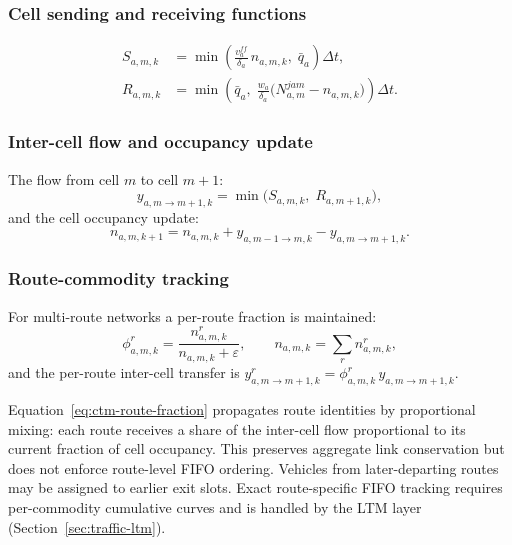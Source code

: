 \subsubsection{Cell sending and receiving functions}

\begin{align}
  S_{a,m,k} &= \min\!\left(\frac{v^{ff}_a}{\delta_a}\,n_{a,m,k},\;
                            \bar{q}_a\right)\!\Delta t,
  \label{eq:ctm-send}\\
  R_{a,m,k} &= \min\!\left(\bar{q}_a,\;
                            \frac{w_a}{\delta_a}
                            \bigl(N^{jam}_{a,m} - n_{a,m,k}\bigr)\right)\!\Delta t.
  \label{eq:ctm-recv}
\end{align}

\subsubsection{Inter-cell flow and occupancy update}

The flow from cell $m$ to cell $m+1$:
\begin{equation}
  y_{a,m\to m+1,k} = \min\!\bigl(S_{a,m,k},\; R_{a,m+1,k}\bigr),
  \label{eq:ctm-intercell-flow}
\end{equation}
and the cell occupancy update:
\begin{equation}
  n_{a,m,k+1} = n_{a,m,k}
    + y_{a,m-1\to m,k}
    - y_{a,m\to m+1,k}.
  \label{eq:ctm-cell-update}
\end{equation}

\subsubsection{Route-commodity tracking}

For multi-route networks a per-route fraction is maintained:
\begin{equation}
  \phi^r_{a,m,k} = \frac{n^r_{a,m,k}}{n_{a,m,k} + \varepsilon},
  \qquad n_{a,m,k} = \sum_{r} n^r_{a,m,k},
  \label{eq:ctm-route-fraction}
\end{equation}
and the per-route inter-cell transfer is
$y^r_{a,m\to m+1,k} = \phi^r_{a,m,k}\, y_{a,m\to m+1,k}$.

\begin{remark}
  Equation~\eqref{eq:ctm-route-fraction} propagates route identities by
  proportional mixing: each route receives a share of the inter-cell flow
  proportional to its current fraction of cell occupancy.  This preserves
  aggregate link conservation but does not enforce route-level FIFO
  ordering.  Vehicles from later-departing routes may be assigned to
  earlier exit slots.  Exact route-specific FIFO tracking requires
  per-commodity cumulative curves and is handled by the LTM layer
  (Section~\ref{sec:traffic-ltm}).
\end{remark}

